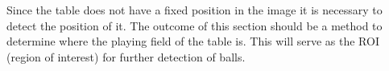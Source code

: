 Since the table does not have a fixed position in the image it is necessary to detect the position of it. The outcome of this section should be a method to determine where the playing field of the table is. This will serve as the ROI (region of interest) for further detection of balls.
